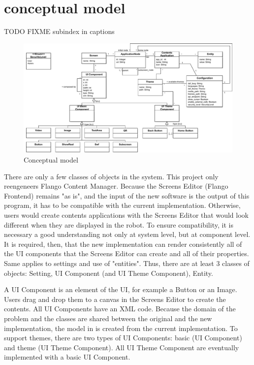 \section{conceptual model}
TODO FIXME subindex in captions
\begin{figure}
    \label{fig:specification-conceptual-model}
    \centering
    \includegraphics[width=\textwidth]{figures/specification-conceptual-model}
    \caption{Conceptual model}
\end{figure}

There are only a few classes of objects in the system.
This project only reengeneers Flango Content Manager.
Because the Screens Editor (Flango Frontend) remains "as is", and the input of the new software is the output of this program, it has to be compatible with the current implementation.
Otherwise, users would create contents applications with the Screens Editor that would look different when they are displayed in the robot.
To ensure compatibility, it is necessary a good understanding not only at system level, but at component level.
It is required, then, that the new implementation can render consistently all of the \ac{UI} components that the Screens Editor can create and all of their properties. 
Same applies to settings and use of "entities".
Thus, there are at least 3 classes of objects: Setting, UI Component (and UI Theme Component), Entity.

A UI Component is an element of the \ac{UI}, for example a Button or an Image.
Users drag and drop them to a canvas in the Screens Editor to create the contents. 
All UI Components have an \ac{XML} code.
Because the domain of the problem and the classes are shared between the original and the new implementation, the model in  is created from the current implementation.
To support themes, there are two types of UI Components: basic (UI Component) and theme (UI Theme Component).
All UI Theme Component are eventually implemented with a basic UI Component.

